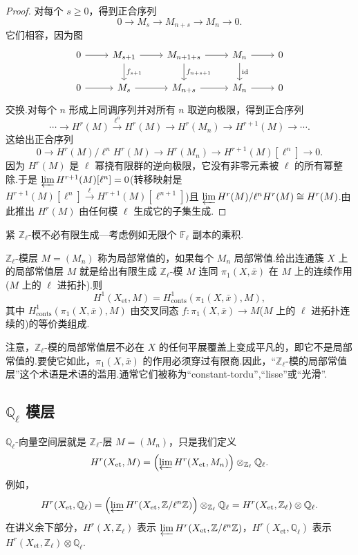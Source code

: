 \begin{proof}
对每个 $s \geq 0$，得到正合序列
\[
0 \to M_s \to M_{n+s} \to M_n \to 0.
\]
它们相容，因为图
\[
\begin{tikzcd}
0 \arrow[r] & M_{s+1} \arrow[r] \arrow[d, "f_{s+1}"] & M_{n+1+s} \arrow[r] \arrow[d, "f_{n+s+1}"] & M_n \arrow[r] \arrow[d, "\mathrm{id}"] & 0 \\
0 \arrow[r] & M_s \arrow[r] & M_{n+s} \arrow[r] & M_n \arrow[r] & 0
\end{tikzcd}
\]
交换.对每个 $n$ 形成上同调序列并对所有 $n$ 取逆向极限，得到正合序列
\[
\cdots \to H^{r}(M) \xrightarrow{\ell^{n}} H^{r}(M) \to H^{r}(M_n) \to H^{r+1}(M) \to \cdots.
\]
这给出正合序列
\[
0 \to H^{r}(M)/\ell^{n}H^{r}(M) \to H^{r}(M_n) \to H^{r+1}(M)[\ell^{n}] \to 0.
\]
因为 $H^{r}(M)$ 是 $\ell$ 幂挠有限群的逆向极限，它没有非零元素被 $\ell$ 的所有幂整除.于是 $\varprojlim H^{r+1}(M)[\ell^{n}] = 0$(转移映射是 $H^{r+1}(M)[\ell^{n}] \xrightarrow{\ell} H^{r+1}(M)[\ell^{n+1}]$)且 $\varprojlim H^{r}(M)/\ell^{n}H^{r}(M) \cong H^{r}(M)$.由此推出 $H^{r}(M)$ 由任何模 $\ell$ 生成它的子集生成.
\end{proof}

\begin{remark}\label{rem:19.3}
紧 $\mathbb{Z}_{\ell}$-模不必有限生成---考虑例如无限个 $\mathbb{F}_{\ell}$ 副本的乘积.

$\mathbb{Z}_{\ell}$-模层 $M = (M_n)$ 称为局部常值的，如果每个 $M_n$ 局部常值.给出连通簇 $X$ 上的局部常值层 $M$ 就是给出有限生成 $\mathbb{Z}_{\ell}$-模 $M$ 连同 $\pi_1(X, \bar{x})$ 在 $M$ 上的连续作用($M$ 上的 $\ell$ 进拓扑).则
\[
H^{1}(X_{\mathrm{et}}, M) = H^{1}_{\mathrm{conts}}(\pi_1(X, \bar{x}), M),
\]
其中 $H^{1}_{\mathrm{conts}}(\pi_1(X, \bar{x}), M)$ 由交叉同态 $f \colon \pi_1(X, \bar{x}) \to M$($M$ 上的 $\ell$ 进拓扑连续的)的等价类组成.

注意，$\mathbb{Z}_{\ell}$-模的局部常值层不必在 $X$ 的任何平展覆盖上变成平凡的，即它不是局部常值的.要使它如此，$\pi_1(X, \bar{x})$ 的作用必须穿过有限商.因此，``$\mathbb{Z}_{\ell}$-模的局部常值层''这个术语是术语的滥用.通常它们被称为``constant-tordu'',``lisse''或``光滑''.
\end{remark}

\subsection*{\texorpdfstring{$\mathbb{Q}_{\ell}$ 模层}{Q\_l 模层}}

$\mathbb{Q}_{\ell}$-向量空间层就是 $\mathbb{Z}_{\ell}$-层 $M = (M_n)$，只是我们定义
\[
H^{r}(X_{\mathrm{et}}, M) = \left( \varprojlim H^{r}(X_{\mathrm{et}}, M_n) \right) \otimes_{\mathbb{Z}_{\ell}} \mathbb{Q}_{\ell}.
\]
例如，
\[
H^{r}(X_{\mathrm{et}}, \mathbb{Q}_{\ell}) = \left( \varprojlim H^{r}(X_{\mathrm{et}}, \mathbb{Z}/\ell^{n}\mathbb{Z}) \right) \otimes_{\mathbb{Z}_{\ell}} \mathbb{Q}_{\ell} = H^{r}(X_{\mathrm{et}}, \mathbb{Z}_{\ell}) \otimes \mathbb{Q}_{\ell}.
\]
在讲义余下部分，$H^{r}(X, \mathbb{Z}_{\ell})$ 表示 $\varprojlim H^{r}(X_{\mathrm{et}}, \mathbb{Z}/\ell^{n}\mathbb{Z})$，$H^{r}(X_{\mathrm{et}}, \mathbb{Q}_{\ell})$ 表示 $H^{r}(X_{\mathrm{et}}, \mathbb{Z}_{\ell}) \otimes \mathbb{Q}_{\ell}$.

